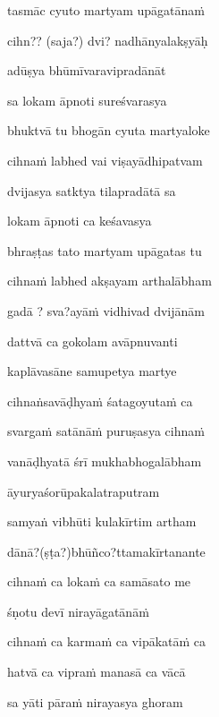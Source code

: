 \nemslokac 
tasmāc cyuto martyam upāgatāna\.m
\dontdisplaylinenum

\nemslokad 
cihn?? (saja?) dvi? nadhānyalakṣyāḥ \veg\dontdisplaylinenum

\ujvers\nemsloka 
adūṣya bhūmīvaravipradānāt
\dontdisplaylinenum

\nemslokab 
sa lokam āpnoti sureśvarasya \danda\dontdisplaylinenum

\nemslokac 
bhuktvā tu bhogān cyuta martyaloke
\dontdisplaylinenum

\nemslokad 
cihna\.m labhed vai viṣayādhipatvam \veg\dontdisplaylinenum

\ujvers\nemsloka 
dvijasya satktya tilapradātā sa
\dontdisplaylinenum

\nemslokab 
lokam āpnoti ca keśavasya \danda\dontdisplaylinenum

\nemslokac 
bhraṣṭas tato martyam upāgatas tu
\dontdisplaylinenum

\nemslokad 
cihna\.m labhed akṣayam arthalābham \veg\dontdisplaylinenum

\ujvers\nemsloka 
gadā ? sva?ayā\.m vidhivad dvijānām
\dontdisplaylinenum

\nemslokab 
dattvā ca gokolam avāpnuvanti \danda\dontdisplaylinenum

\nemslokac 
kaplāvasāne samupetya martye
\dontdisplaylinenum

\nemslokad 
cihnaṅsavāḍhya\.m śatagoyuta\.m ca \veg\dontdisplaylinenum

\ujvers\nemsloka 
svarga\.m satānā\.m puruṣasya cihna\.m
\dontdisplaylinenum

\nemslokab 
vanāḍhyatā śrī mukhabhogalābham \danda\dontdisplaylinenum

\nemslokac 
āyuryaśorūpakalatraputram
\dontdisplaylinenum

\nemslokad 
samyaṅ vibhūti kulakīrtim artham \veg\dontdisplaylinenum

\ujvers\nemsloka 
dānā?(ṣṭa?)bhūñco?ttamakīrtanante
\dontdisplaylinenum

\nemslokab 
cihna\.m ca loka\.m ca samāsato me \danda\dontdisplaylinenum

\nemslokac 
śṇotu devī nirayāgatānā\.m
\dontdisplaylinenum

\nemslokad 
cihna\.m ca karma\.m ca vipākatā\.m ca \veg\dontdisplaylinenum

\ujvers\nemsloka 
hatvā ca vipra\.m manasā ca vācā
\dontdisplaylinenum

\nemslokab 
sa yāti pāra\.m nirayasya ghoram \danda\dontdisplaylinenum

